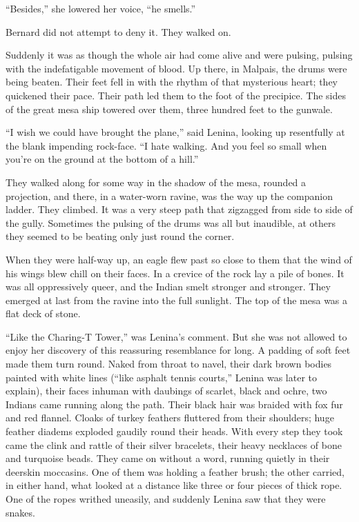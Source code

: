 \documentclass[12pt]{report}
\begin{document}
``Besides,'' she lowered her voice, ``he smells.''

Bernard did not attempt to deny it. They walked on.

Suddenly it was as though the whole air had come alive and were pulsing,
pulsing with the indefatigable movement of blood. Up there, in Malpais,
the drums were being beaten. Their feet fell in with the rhythm of that
mysterious heart; they quickened their pace. Their path led them to the
foot of the precipice. The sides of the great mesa ship towered over
them, three hundred feet to the gunwale.

``I wish we could have brought the plane,'' said Lenina, looking up
resentfully at the blank impending rock-face. ``I hate walking. And you
feel so small when you're on the ground at the bottom of a hill.''

They walked along for some way in the shadow of the mesa, rounded a
projection, and there, in a water-worn ravine, was the way up the
companion ladder. They climbed. It was a very steep path that zigzagged
from side to side of the gully. Sometimes the pulsing of the drums was
all but inaudible, at others they seemed to be beating only just round
the corner.

When they were half-way up, an eagle flew past so close to them that the
wind of his wings blew chill on their faces. In a crevice of the rock
lay a pile of bones. It was all oppressively queer, and the Indian smelt
stronger and stronger. They emerged at last from the ravine into the
full sunlight. The top of the mesa was a flat deck of stone.

``Like the Charing-T Tower,'' was Lenina's comment. But she was not
allowed to enjoy her discovery of this reassuring resemblance for long.
A padding of soft feet made them turn round. Naked from throat to navel,
their dark brown bodies painted with white lines (``like asphalt tennis
courts,'' Lenina was later to explain), their faces inhuman with
daubings of scarlet, black and ochre, two Indians came running along the
path. Their black hair was braided with fox fur and red flannel. Cloaks
of turkey feathers fluttered from their shoulders; huge feather diadems
exploded gaudily round their heads. With every step they took came the
clink and rattle of their silver bracelets, their heavy necklaces of
bone and turquoise beads. They came on without a word, running quietly
in their deerskin moccasins. One of them was holding a feather brush;
the other carried, in either hand, what looked at a distance like three
or four pieces of thick rope. One of the ropes writhed uneasily, and
suddenly Lenina saw that they were snakes.
\end{document}
